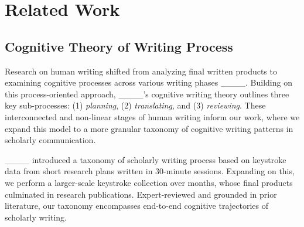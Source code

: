 \section{Related Work}
\subsection{Cognitive Theory of Writing Process}

Research on human writing shifted from analyzing final written products to examining cognitive processes across various writing phases ____. 
Building on this process-oriented approach, ____’s cognitive writing theory outlines three key sub-processes: (1) \textit{planning}, (2) \textit{translating}, and (3) \textit{reviewing}. These interconnected and non-linear stages of human writing inform our work, where we expand this model to a more granular taxonomy of cognitive writing patterns in scholarly communication.

____ introduced a taxonomy of scholarly writing process based on keystroke data from short research plans written in 30-minute sessions. Expanding on this, we perform a larger-scale keystroke collection over months, whose final products culminated in research publications. Expert-reviewed and grounded in prior literature, our taxonomy encompasses end-to-end cognitive trajectories of scholarly writing.




